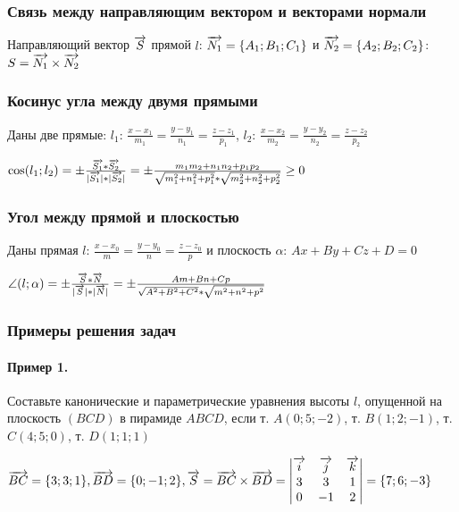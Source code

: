 \documentclass{article}
\def\vec{\ensuremath\overrightarrow}
\begin{document}
\begin{flushleft}
\subsubsection{Связь между направляющим вектором и векторами нормали}

Направляющий вектор $\vec{S}$ прямой $l$: $\vec{N_1} = \{ A_1; B_1; C_1 \}$ и $\vec{N_2} = \{ A_2; B_2; C_2 \}$: $S = \vec{N_1} \times \vec{N_2}$

\subsubsection{Косинус угла между двумя прямыми}

Даны две прямые: $l_1$: $\frac{x - x_1}{m_1} = \frac{y - y_1}{n_1} = \frac{z - z_1}{p_1}$, $l_2$: $\frac{x - x_2}{m_2} = \frac{y - y_2}{n_2} = \frac{z - z_2}{p_2}$

$\cos (l_1; l_2) = \pm \frac{\vec{S_1} * \vec{S_2}}{|\vec{S_1}| * |\vec{S_2}|} = \pm \frac{m_1 m_2 + n_1 n_2 + p_1 p_2}{\sqrt{m_1^2 + n_1^2 + p_1^2} * \sqrt{m_2^2 + n_2^2 + p_2^2}} \ge 0$

\subsubsection{Угол между прямой и плоскостью}

Даны прямая $l$: $\frac{x - x_0}{m} = \frac{y - y_0}{n} = \frac{z - z_0}{p}$ и плоскость $\alpha$: $Ax + By + C z + D = 0$

$\angle (l; \alpha) = \pm \frac{\vec{S} * \vec{N}}{|\vec{S}| * |\vec{N}|} = \pm \frac{A m + B n + C p}{\sqrt{A^2 + B^2 + C^2} * \sqrt{m^2 + n ^2 + p^2}}$

\subsubsection{Примеры решения задач}

\paragraph{Пример 1.} Составьте канонические и параметрические уравнения высоты $l$, опущенной на плоскость $(B C D)$ в пирамиде $A B C D$, если т. $A(0; 5; -2)$, т. $B(1; 2; -1)$, т. $C(4; 5; 0)$, т. $D(1; 1; 1)$

$\vec{BC} = \{ 3; 3; 1 \}, \vec{B D} = \{ 0; -1; 2 \}, \vec{S} = \vec{BC} \times \vec{B D} = \begin{vmatrix}
    \vec{i} & \vec{j} & \vec{k} \\
    3 & 3 & 1 \\
    0 & -1 & 2
\end{vmatrix} = \{ 7; 6; -3 \}$


\end{flushleft}
\end{document}

